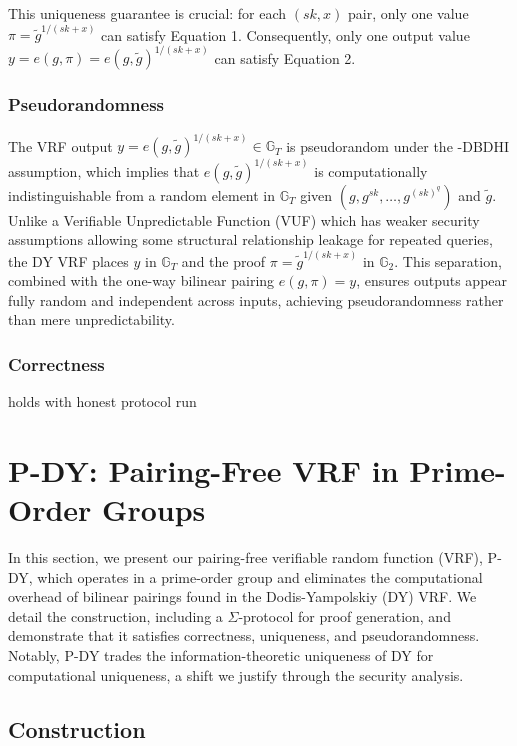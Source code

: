 This uniqueness guarantee is crucial: for each $(sk,x)$ pair, only one value $\pi = \tilde{g}^{1/(sk+x)}$ can satisfy Equation 1. Consequently, only one output value $y = e(g, \pi) = e(g, \tilde{g})^{1/(sk+x)}$ can satisfy Equation 2.


\subsubsection*{Pseudorandomness}
The VRF output $ y = e(g, \tilde{g})^{1/(sk + x)} \in \mathbb{G}_T $ is pseudorandom under the $ $-DBDHI assumption, which implies that $ e(g, \tilde{g})^{1/(sk + x)} $ is computationally indistinguishable from a random element in $ \mathbb{G}_T $ given $ (g, g^{sk}, \ldots, g^{(sk)^q}) $ and $ \tilde{g} $. Unlike a Verifiable Unpredictable Function (VUF) which has weaker security assumptions allowing some structural relationship leakage for repeated queries, the DY VRF places $ y $ in $ \mathbb{G}_T $ and the proof $ \pi = \tilde{g}^{1/(sk + x)} $ in $ \mathbb{G}_2 $. This separation, combined with the one-way bilinear pairing $ e(g, \pi) = y $, ensures outputs appear fully random and independent across inputs, achieving pseudorandomness rather than mere unpredictability.


\subsubsection*{Correctness} holds with honest protocol run





\section{P-DY: Pairing-Free VRF in Prime-Order Groups}

In this section, we present our pairing-free verifiable random function (VRF), P-DY, which operates in a prime-order group and eliminates the computational overhead of bilinear pairings found in the Dodis-Yampolskiy (DY) VRF. We detail the construction, including a $\Sigma$-protocol for proof generation, and demonstrate that it satisfies correctness, uniqueness, and pseudorandomness. Notably, P-DY trades the information-theoretic uniqueness of DY for computational uniqueness, a shift we justify through the security analysis.

\subsection{Construction}

